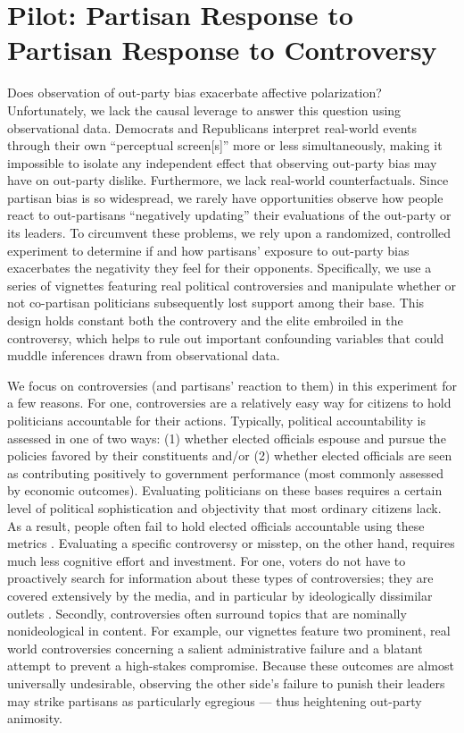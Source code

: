 \documentclass[12pt, letterpaper]{article}
\begin{document}
\section*{Pilot: Partisan Response to Partisan Response to Controversy}

Does observation of out-party bias exacerbate affective polarization? Unfortunately, we lack the causal leverage to answer this question using observational data. Democrats and Republicans interpret real-world events through their own ``perceptual screen[s]'' \citep{campbell1960} more or less simultaneously, making it impossible to isolate any independent effect that observing out-party bias may have on out-party dislike. Furthermore, we lack real-world counterfactuals. Since partisan bias is so widespread, we rarely have opportunities observe how people react to out-partisans ``negatively updating'' their evaluations of the out-party or its leaders. To circumvent these problems, we rely upon a randomized, controlled experiment to determine if and how partisans' exposure to out-party bias exacerbates the negativity they feel for their opponents. Specifically, we use a series of vignettes featuring real political controversies and manipulate whether or not co-partisan politicians subsequently lost support among their base. This design holds constant both the controvery and the elite embroiled in the controversy, which helps to rule out important confounding variables that could muddle inferences drawn from observational data. 

We focus on controversies (and partisans' reaction to them) in this experiment for a few reasons. For one, controversies are a relatively easy way for citizens to hold politicians accountable for their actions. Typically, political accountability is assessed in one of two ways:  (1) whether elected officials espouse and pursue the policies favored by their constituents and/or (2) whether elected officials are seen as contributing positively to government performance (most commonly assessed by economic outcomes). Evaluating politicians on these bases requires a certain level of political sophistication and objectivity that most ordinary citizens lack. As a result, people often fail to hold elected officials accountable using these metrics \citep[e.g.,][]{achen2016democracy,Bartels2008,healylenz_2014,Lenz2012,snidermanstiglitz_2012,soodiyengar_2014}. Evaluating a specific controversy or misstep, on the other hand, requires much less cognitive effort and investment. For one, voters do not have to proactively search for information about these types of controversies; they are covered extensively by the media, and in particular by ideologically dissimilar outlets \citep{budaketal_2016,puglisisnyder_2011}. Secondly, controversies often surround topics that are nominally nonideological in content. For example, our vignettes feature two prominent, real world controversies concerning a salient administrative failure and a blatant attempt to prevent a high-stakes compromise. Because these outcomes are almost universally undesirable, observing the other side's failure to punish their leaders may strike partisans as particularly egregious --- thus heightening out-party animosity. 
\end{document}
